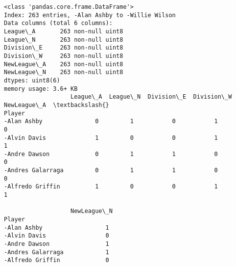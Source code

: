 \documentclass[11pt]{article}
\begin{document}
    \begin{Verbatim}[commandchars=\\\{\}]
<class 'pandas.core.frame.DataFrame'>
Index: 263 entries, -Alan Ashby to -Willie Wilson
Data columns (total 6 columns):
League\_A       263 non-null uint8
League\_N       263 non-null uint8
Division\_E     263 non-null uint8
Division\_W     263 non-null uint8
NewLeague\_A    263 non-null uint8
NewLeague\_N    263 non-null uint8
dtypes: uint8(6)
memory usage: 3.6+ KB
                   League\_A  League\_N  Division\_E  Division\_W  NewLeague\_A  \textbackslash{}
Player                                                                       
-Alan Ashby               0         1           0           1            0   
-Alvin Davis              1         0           0           1            1   
-Andre Dawson             0         1           1           0            0   
-Andres Galarraga         0         1           1           0            0   
-Alfredo Griffin          1         0           0           1            1   

                   NewLeague\_N  
Player                          
-Alan Ashby                  1  
-Alvin Davis                 0  
-Andre Dawson                1  
-Andres Galarraga            1  
-Alfredo Griffin             0  

    \end{Verbatim}
\end{document}
